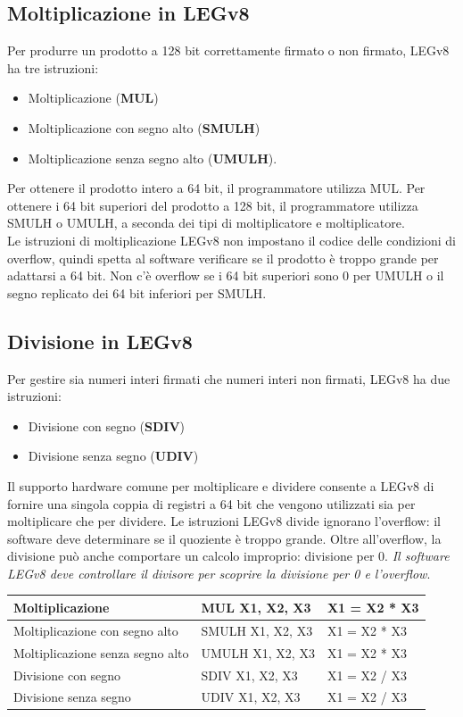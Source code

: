 \documentclass[12pt,a4paper]{article}
\begin{document}
\subsection{Moltiplicazione in LEGv8}
Per produrre un prodotto a 128 bit correttamente firmato o non firmato, LEGv8 ha tre istruzioni:
\begin{itemize}
\item Moltiplicazione (\textbf{MUL})
\item Moltiplicazione con segno alto (\textbf{SMULH})
\item Moltiplicazione senza segno alto (\textbf{UMULH}).
\end{itemize}
Per ottenere il prodotto intero a 64 bit, il programmatore utilizza MUL. Per ottenere i 64 bit superiori del prodotto a 128 bit, il programmatore utilizza SMULH o UMULH, a seconda dei tipi di moltiplicatore e moltiplicatore.\\
Le istruzioni di moltiplicazione LEGv8 non impostano il codice delle condizioni di overflow, quindi spetta al software verificare se il prodotto è troppo grande per adattarsi a 64 bit. Non c'è overflow se i 64 bit superiori sono 0 per UMULH o il segno replicato dei 64 bit inferiori per SMULH.

\subsection{Divisione in LEGv8}
Per gestire sia numeri interi firmati che numeri interi non firmati, LEGv8 ha due istruzioni:
\begin{itemize}
\item Divisione con segno (\textbf{SDIV})
\item Divisione senza segno (\textbf{UDIV})
\end{itemize}
Il supporto hardware comune per moltiplicare e dividere consente a LEGv8 di fornire una singola coppia di registri a 64 bit che vengono utilizzati sia per moltiplicare che per dividere. Le istruzioni LEGv8 divide ignorano l'overflow: il software deve determinare se il quoziente è troppo grande. Oltre all'overflow, la divisione può anche comportare un calcolo improprio: divisione per 0. \textsl{Il software LEGv8 deve controllare il divisore per scoprire la divisione per 0 e l'overflow}.

\begin{center}
\begin{tabular}{|l|l|l|}
\hline
Moltiplicazione & MUL X1, X2, X3 & X1 = X2 * X3\\ \hline
Moltiplicazione con segno alto & SMULH X1, X2, X3 & X1 = X2 * X3\\ \hline
Moltiplicazione senza segno alto & UMULH X1, X2, X3 & X1 = X2 * X3\\ \hline
Divisione con segno & SDIV X1, X2, X3 & X1 = X2 / X3\\ \hline
Divisione senza segno & UDIV X1, X2, X3 & X1 = X2 / X3\\ \hline
\end{tabular}
\end{center}
\end{document}
